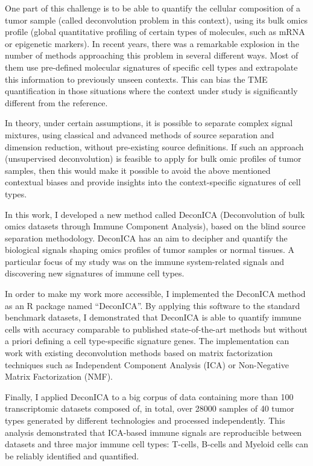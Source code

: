 \documentclass[12pt,]{book}
\theoremstyle{definition}
\theoremstyle{definition}
\theoremstyle{definition}
\theoremstyle{remark}
\begin{document}
\begin{titlepage}
One part of this challenge is to be able to quantify the cellular composition of a tumor sample (called deconvolution problem in this context), using its bulk omics profile (global quantitative profiling of certain types of molecules, such as mRNA or epigenetic markers). In recent years, there was a remarkable explosion in the number of methods approaching this problem in several different ways. Most of them use pre-defined molecular signatures of specific cell types and extrapolate this information to previously unseen contexts. This can bias the TME quantification in those situations where the context under study is significantly different from the reference.

In theory, under certain assumptions, it is possible to separate complex signal mixtures, using classical and advanced methods of source separation and dimension reduction, without pre-existing source definitions. If such an approach (unsupervised deconvolution) is feasible to apply for bulk omic profiles of tumor samples, then this would make it possible to avoid the above mentioned contextual biases and provide insights into the context-specific signatures of cell types.

In this work, I developed a new method called DeconICA (Deconvolution of bulk omics datasets through Immune Component Analysis), based on the blind source separation methodology. DeconICA has an aim to decipher and quantify the biological signals shaping omics profiles of tumor samples or normal tissues. A particular focus of my study was on the immune system-related signals and discovering new signatures of immune cell types. 

In order to make my work more accessible, I implemented the DeconICA method as an R package named “DeconICA”.  By applying this software to the standard benchmark datasets, I demonstrated that DeconICA is able to quantify immune cells with accuracy comparable to published state-of-the-art methods but without a priori defining a cell type-specific signature genes. The implementation can work with existing deconvolution methods based on matrix factorization techniques such as Independent Component Analysis (ICA) or Non-Negative Matrix Factorization (NMF).

Finally, I applied DeconICA to a big corpus of data containing more than 100 transcriptomic datasets composed of, in total, over 28000 samples of 40 tumor types generated by different technologies and processed independently. This analysis demonstrated that ICA-based immune signals are reproducible between datasets and three major immune cell types: T-cells, B-cells and Myeloid cells can be reliably identified and quantified. 


\end{titlepage}
\end{document}
